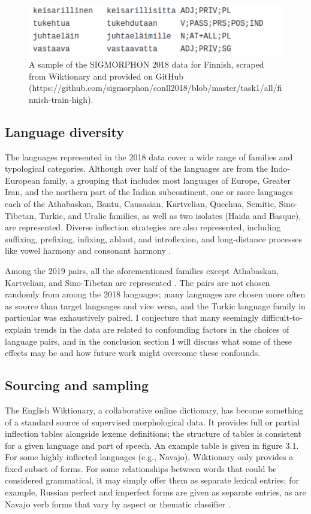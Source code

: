 \begin{figure}[ht]
\includegraphics[width=12cm]{images/sigmorphon2018_fn.png}
\centering
\caption{A sample of the SIGMORPHON 2018 data for Finnish, scraped from Wiktionary and provided on GitHub (https://github.com/sigmorphon/conll2018/blob/master/task1/all/finnish-train-high).}
\end{figure}

\subsection{Language diversity}

The languages represented in the 2018 data cover a wide range of families and typological categories. Although over half of the languages are from the Indo-European family, a grouping that includes most languages of Europe, Greater Iran, and the northern part of the Indian subcontinent, one or more languages each of the Athabaskan, Bantu, Causasian, Kartvelian, Quechua, Semitic, Sino-Tibetan, Turkic, and Uralic families, as well as two isolates (Haida and Basque), are represented. Diverse inflection strategies are also represented, including suffixing, prefixing, infixing, ablaut, and introflexion, and long-distance processes like vowel harmony and consonant harmony \parencite{Cotterell2018b}. 

Among the 2019 pairs, all the aforementioned families except Athabaskan, Kartvelian, and Sino-Tibetan are represented \parencite{McCarthy2019}. The pairs are not chosen randomly from among the 2018 languages; many languages are chosen more often as source than target languages and vice versa, and the Turkic language family in particular was exhaustively paired. I conjecture that many seemingly difficult-to-explain trends in the data are related to confounding factors in the choices of language pairs, and in the conclusion section I will discuss what some of these effects may be and how future work might overcome these confounds.

\subsection{Sourcing and sampling}

The English Wiktionary, a collaborative online dictionary, has become something of a standard source of supervised morphological data. It provides full or partial inflection tables alongside lexeme definitions; the structure of tables is consistent for a given language and part of speech. An example table is given in figure 3.1. For some highly inflected languages (e.g., Navajo), Wiktionary only provides a fixed subset of forms. For some relationships between words that could be considered grammatical, it may simply offer them as separate lexical entries; for example, Russian perfect and imperfect forms are given as separate entries, as are Navajo verb forms that vary by aspect or thematic classifier \parencite{Wiktionary}.  

